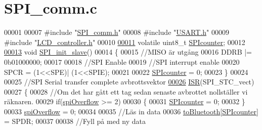 \hypertarget{_s_p_i__comm_8c_source}{}\section{S\+P\+I\+\_\+comm.\+c}
\label{_s_p_i__comm_8c_source}

\begin{DoxyCode}
00001 
00007 \textcolor{preprocessor}{#include "\hyperlink{_s_p_i__comm_8h}{SPI\_comm.h}"}
00008 \textcolor{preprocessor}{#include "\hyperlink{_u_s_a_r_t_8h}{USART.h}"}
00009 \textcolor{preprocessor}{#include "\hyperlink{_l_c_d__controller_8h}{LCD\_controller.h}"}
00010 
\hypertarget{_s_p_i__comm_8c_source.tex_l00011}{}\hyperlink{_s_p_i__comm_8c_a65d46084e88aa717b668dffbbda1bf3b}{00011} \textcolor{keyword}{volatile} uint8\_t \hyperlink{_s_p_i__comm_8c_a65d46084e88aa717b668dffbbda1bf3b}{SPIcounter};
00012 
\hypertarget{_s_p_i__comm_8c_source.tex_l00013}{}\hyperlink{_s_p_i__comm_8h_a9208b9a00dfa335b5dd56360ea5c7813}{00013} \textcolor{keywordtype}{void} \hyperlink{_s_p_i__comm_8c_a9208b9a00dfa335b5dd56360ea5c7813}{SPI\_init\_slave}()
00014 \{
00015     \textcolor{comment}{//MISO är utgång}
00016     DDRB |= 0b01000000;
00017     
00018     \textcolor{comment}{//SPI Enable}
00019     \textcolor{comment}{//SPI interrupt enable}
00020     SPCR = (1<<SPE)| (1<<SPIE);
00021     
00022     \hyperlink{_s_p_i__comm_8c_a65d46084e88aa717b668dffbbda1bf3b}{SPIcounter} = 0;
00023 \}
00024 
00025 \textcolor{comment}{//SPI Serial transfer complete avbrottsvektor}
\hypertarget{_s_p_i__comm_8c_source.tex_l00026}{}\hyperlink{_s_p_i__comm_8c_af9cad97352f5ba9bbd800446131125a6}{00026} \hyperlink{_s_p_i__comm_8c_af9cad97352f5ba9bbd800446131125a6}{ISR}(SPI\_STC\_vect)
00027 \{
00028     \textcolor{comment}{//Om det har gått ett tag sedan senaste avbrottet nollställer vi räknaren.}
00029     \textcolor{keywordflow}{if}(\hyperlink{_l_c_d__controller_8h_a5462652fe95683f50bcbd6d5fbbc3ae1}{spiOverflow} >= 2)
00030     \{
00031         \hyperlink{_s_p_i__comm_8c_a65d46084e88aa717b668dffbbda1bf3b}{SPIcounter} = 0;
00032     \}
00033     \hyperlink{_l_c_d__controller_8h_a5462652fe95683f50bcbd6d5fbbc3ae1}{spiOverflow} = 0;
00034     
00035     \textcolor{comment}{//Läs in data}
00036     \hyperlink{_buffers_8h_af10085b37b41fff01ad209e47f7d4e44}{toBluetooth}[\hyperlink{_s_p_i__comm_8c_a65d46084e88aa717b668dffbbda1bf3b}{SPIcounter}] = SPDR;
00037     
00038     \textcolor{comment}{//Fyll på med ny data}

\end{DoxyCode}
